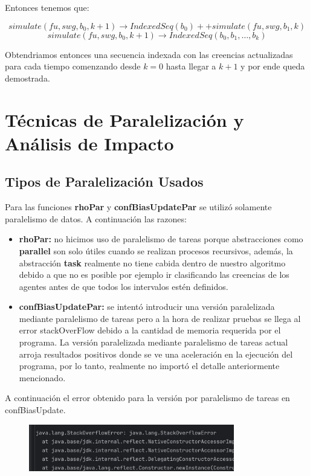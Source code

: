 \documentclass{article}
\begin{document}
    Entonces tenemos que:

    \[simulate(fu,swg,b_0,k+1) \rightarrow IndexedSeq(b_0)++simulate(fu,swg,b_1,k)\]
    \[simulate(fu,swg,b_0,k+1) \rightarrow IndexedSeq(b_0,b_1,\ldots,b_k)\]

    Obtendriamos entonces una secuencia indexada con las creencias actualizadas para cada tiempo comenzando desde $k=0$ hasta llegar a $k+1$ y por ende queda demostrada.

  \section{Técnicas de Paralelización y Análisis de Impacto}

    \subsection{Tipos de Paralelización Usados}
    Para las funciones \textbf{rhoPar} y \textbf{confBiasUpdatePar} se utilizó solamente paralelismo de datos. A continuación  las razones:

    \begin{itemize}
      \item \textbf{rhoPar:} no hicimos uso de paralelismo de tareas porque abstracciones como \textbf{parallel} son solo útiles cuando se realizan procesos recursivos, además, la abstracción \textbf{task} realmente no tiene cabida dentro de nuestro algoritmo debido a que no es posible por ejemplo ir clasificando las creencias de los agentes antes de que todos los intervalos estén definidos.
      \item \textbf{confBiasUpdatePar:} se intentó introducir una versión paralelizada mediante paralelismo de tareas pero a la hora de realizar pruebas se llega al error stackOverFlow debido a la cantidad de memoria requerida por el programa. La versión paralelizada mediante paralelismo de tareas actual arroja resultados positivos donde se ve una aceleración en la ejecución del programa, por lo tanto, realmente no importó el detalle anteriormente mencionado.
    \end{itemize}

    A continuación el error obtenido para la versión por paralelismo de tareas en confBiasUpdate.

    \begin{figure}[H]
      \centering
      \includegraphics[width=0.8\textwidth]{images/stackOverFlow.jpg}
    \end{figure}
\end{document}
